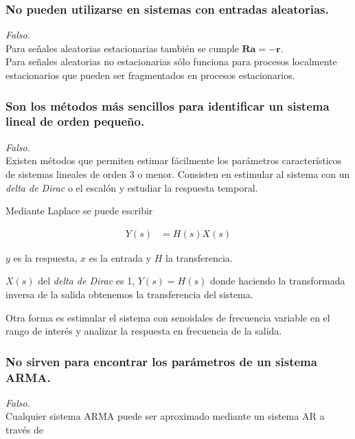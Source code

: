 \documentclass[a4paper,10pt,spanish,oneside]{article}
\begin{document}
\subsubsection{No pueden utilizarse en sistemas con entradas aleatorias.}

\textit{Falso.} \\

Para señales aleatorias estacionarias también se cumple $\mathbf{Ra}=-\mathbf{r}$. \\

Para señales aleatorias no estacionarias sólo funciona para procesos localmente estacionarios que pueden ser fragmentados en procesos estacionarios.

\subsubsection{Son los métodos más sencillos para identificar un sistema lineal de orden 		pequeño.}	

\textit{Falso.} \\

Existen métodos que permiten estimar fácilmente los parámetros característicos de sistemas lineales de orden 3 o menor. Consisten en estimular al sistema con un \textit{delta de Dirac} o el escalón y estudiar la respuesta temporal.

Mediante Laplace se puede escribir

\begin{align*}
Y(s) &= H(s)X(s)
\end{align*}

$y$ es la respuesta, $x$ es la entrada y $H$ la transferencia.

$X(s)$ del \textit{delta de Dirac} es 1, $Y(s)=H(s)$ donde haciendo la transformada inversa de la salida obtenemos la transferencia del sistema.

Otra forma es estimular el sistema con senoidales de frecuencia variable en el rango de interés y analizar la respuesta en frecuencia de la salida.

\subsubsection{No sirven para encontrar los parámetros de un sistema ARMA.}

\textit{Falso.}\\

Cualquier sistema ARMA puede ser aproximado mediante un sistema AR a través de
\end{document}
